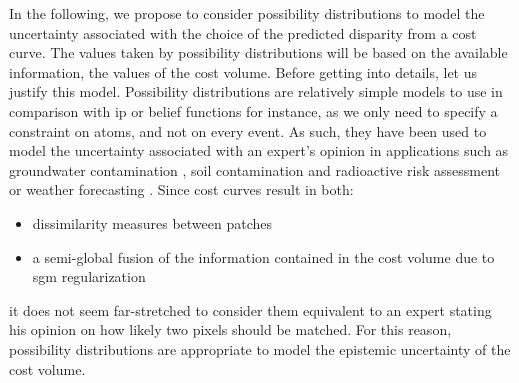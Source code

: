 In the following, we propose to consider possibility distributions to model the uncertainty associated with the choice of the predicted disparity from a cost curve. The values taken by possibility distributions will be based on the available information, \ie the values of the cost volume. Before getting into details, let us justify this model. Possibility distributions are relatively simple models to use in comparison with \acrlong{ip} or belief functions for instance, as we only need to specify a constraint on atoms, and not on every event. As such, they have been used to model the uncertainty associated with an expert's opinion in applications such as groundwater contamination \cite{bardossy_l-_1995}, soil contamination and radioactive risk assessment \cite{baudrit_comparing_2005,baudrit_representation_2005,baudrit_joint_2007} or weather forecasting \cite{le_carrer_beyond_2021}. Since cost curves result in both:
\begin{itemize}
	\item dissimilarity measures between patches 
	\item a semi-global fusion of the information contained in the cost volume due to \acrshort{sgm} regularization
\end{itemize}it does not seem far-stretched to consider them equivalent to an expert stating his opinion on how likely two pixels should be matched. For this reason, possibility distributions are appropriate to model the epistemic uncertainty of the cost volume.

